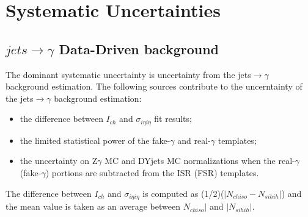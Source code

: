 \section{Systematic Uncertainties}
\label{sec:Systematics}

\subsection{$jets\rightarrow\gamma$ Data-Driven background}

The dominant systematic uncertainty is uncertainty from the jets$\rightarrow\gamma$ background estimation. The following sources contribute to the uncerntainty of  the jets$\rightarrow\gamma$ background estimation:

\begin{itemize}
  \item the difference between $I_{ch}$ and $\sigma_{i\eta i\eta}$ fit results;
  \item the limited statistical power of the fake-$\gamma$ and real-$\gamma$ templates;
  \item the uncertainty on Z$\gamma$ MC and DYjets MC normalizations when the real-$\gamma$ (fake-$\gamma$) portions are subtracted from the ISR (FSR) templates. 
\end{itemize}

The difference between $I_{ch}$ and $\sigma_{i\eta i\eta}$ is computed as (1/2)($|N_{chiso}-N_{sihih}|$) and the mean value is taken as an average between $N_{chiso}|$ and $|N_{sihih}|$.

